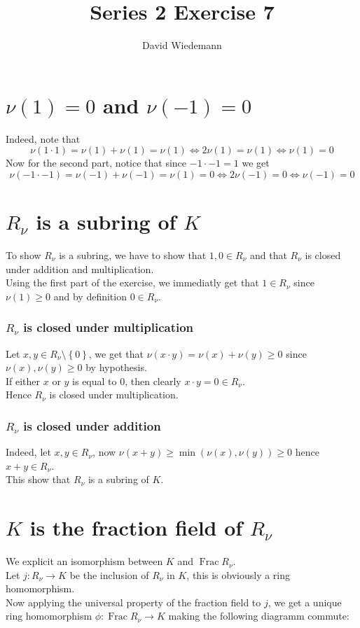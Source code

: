 \documentclass[11pt, a4paper]{article}
\DeclareMathOperator{\fr}{Frac}
\begin{document}
\title{Series 2 Exercise 7}
\author{David Wiedemann}
\maketitle
\section{$\nu( 1) = 0$ and $\nu( -1) =0$  }
Indeed, note that 
\[ 
\nu( 1\cdot 1) = \nu( 1) +\nu( 1) = \nu(1) \iff 2\nu( 1) =\nu( 1) \iff \nu( 1) =0
\]
Now for the second part, notice that since $-1\cdot -1 = 1$ we get
\[ 
\nu( -1\cdot -1) = \nu( -1) +\nu( -1) = \nu( 1) = 0\iff 2\nu( -1) =0 \iff \nu( -1) =0
\]
\section{$R_\nu$ is a subring of $K$ }
To show $R_\nu$ is a subring, we have to show that $  1,0\in R_{\nu} $ and that $R_\nu$  is closed under addition and multiplication.\\

Using the first part of the exercise, we immediatly get that $1\in R_\nu$ since $\nu( 1) \geq 0$  and by definition $0\in R_\nu$.
\subsubsection*{ $R_\nu$ is closed under multiplication}
Let $x,y \in R_\nu\setminus \left\{ 0 \right\} 	$, we get that $\nu( x\cdot y) = \nu( x) +\nu( y) \geq 0$ since $\nu( x) ,\nu( y) \geq 0$ by hypothesis.\\
If either $x$ or $y$ is equal to 0, then clearly $x\cdot y = 0\in R_\nu.$\\
Hence $R_\nu$ is closed under multiplication.
\subsubsection*{ $R_\nu$ is closed under addition}
Indeed, let $x,y\in R_\nu$, now $ \nu( x+y) \geq \min ( \nu( x) ,\nu( y) ) \geq 0$ hence $x+y\in R_\nu$.\\

This show that $R_\nu$ is a subring of $K$.
\section{$K$ is the fraction field of $R_\nu$ }
We explicit an isomorphism between $K$ and $\fr R_\nu$.\\
Let $j: R_\nu \to K$ be the inclusion of $R_\nu$ in $K$, this is obviously a ring homomorphism.\\
Now applying the universal property of the fraction field to $j$, we get a unique ring homomorphism $\phi: \fr R_\nu\to K$ making the following diagramm commute:
\end{document}
